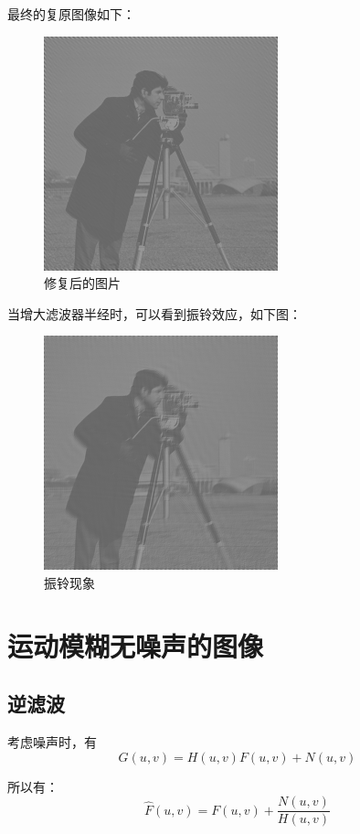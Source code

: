 \documentclass{article}
\begin{document}
			最终的复原图像如下：
			\begin{figure}[H]
				\centering
				\includegraphics[scale = 0.7]{new.png} 
				\caption{修复后的图片}
			\end{figure}
			
			当增大滤波器半经时，可以看到振铃效应，如下图：
			\begin{figure}[H]
				\centering
				\includegraphics[scale = 0.7]{振铃.png} 
				\caption{振铃现象}
			\end{figure}
		
	\section{运动模糊无噪声的图像}
		\subsection{逆滤波}
			考虑噪声时，有
			$$ G(u,v) = H(u,v) F(u,v) +N(u,v)$$	
			
			所以有：
			$$ \hat{F}(u ,v) = F(u ,v) + \frac{N(u ,v)}{H(u ,v)}$$	
			
\end{document}
